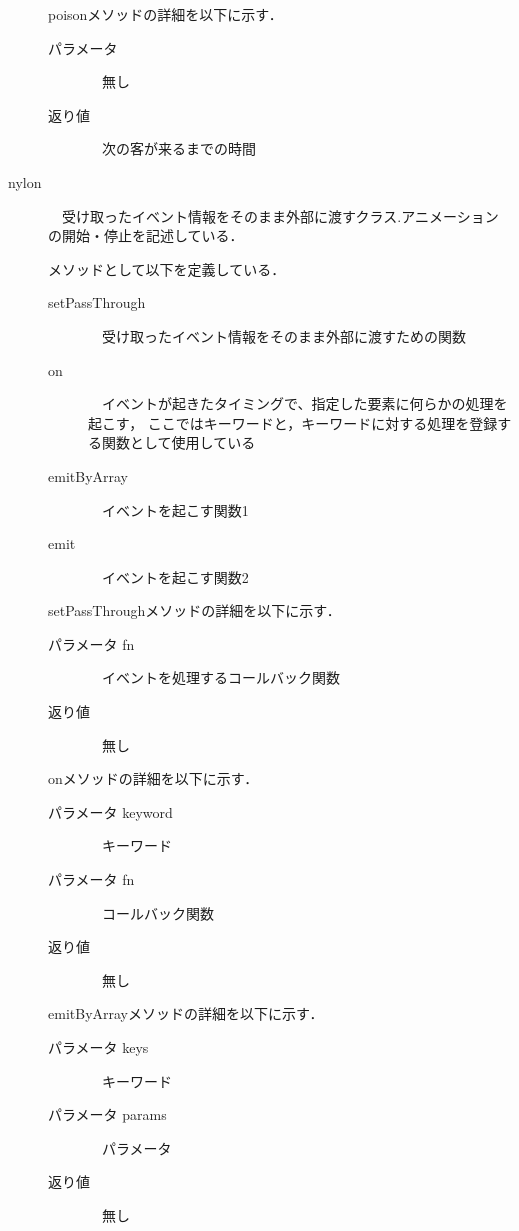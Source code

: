 \documentclass[12pt,a4j]{ltjsarticle}
\begin{document}
\begin{description}
poisonメソッドの詳細を以下に示す．
\begin{description}
	\item[パラメータ]　無し	
	\item[返り値]　次の客が来るまでの時間
\end{description}
\vspace{10mm}
\clearpage


\item[nylon]　受け取ったイベント情報をそのまま外部に渡すクラス.アニメーションの開始・停止を記述している．

メソッドとして以下を定義している．
\begin{description}
	\item[setPassThrough]　受け取ったイベント情報をそのまま外部に渡すための関数
	\item[on]　イベントが起きたタイミングで、指定した要素に何らかの処理を起こす，
ここではキーワードと，キーワードに対する処理を登録する関数として使用している
	\item[emitByArray]　イベントを起こす関数1
	\item[emit]　イベントを起こす関数2
\end{description}
\vspace{5mm}

setPassThroughメソッドの詳細を以下に示す．
\begin{description}
	\item[パラメータ fn]　イベントを処理するコールバック関数
	\item[返り値]　無し
\end{description}
\vspace{5mm}

onメソッドの詳細を以下に示す．
\begin{description}
	\item[パラメータ keyword]　キーワード
	\item[パラメータ fn]　コールバック関数
	\item[返り値]　無し
\end{description}
\vspace{5mm}

emitByArrayメソッドの詳細を以下に示す．
\begin{description}
	\item[パラメータ keys]　キーワード
	\item[パラメータ params]　パラメータ
	\item[返り値]　無し
\end{description}
\vspace{5mm}


\end{description}
\end{document}
